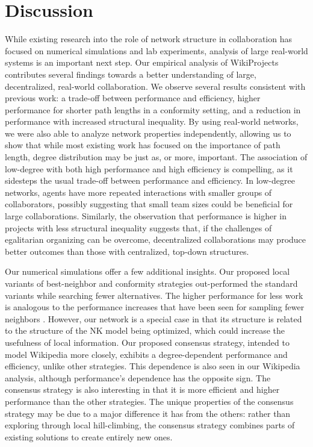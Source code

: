 \section{Discussion}
\label{sec:discuss}

While existing research into the role of network structure in collaboration
has focused on numerical simulations and lab experiments,
analysis of large real-world systems is an important next step.
Our empirical analysis of WikiProjects contributes several findings towards a better
understanding of large, decentralized, real-world collaboration.
We observe several results consistent with previous work:
a trade-off between performance and efficiency,
higher performance for shorter path lengths in a conformity setting,
and a reduction in performance with increased structural inequality.
By using real-world networks, we were also able to analyze network properties independently,
allowing us to show that while most existing work has focused on the importance of path length,
degree distribution may be just as, or more, important.
The association of low-degree with both high performance and high efficiency is compelling,
as it sidesteps the usual trade-off between performance and efficiency.
In low-degree networks, agents have more repeated interactions with smaller groups of collaborators,
possibly suggesting that small team sizes could be beneficial for large collaborations.
Similarly, the observation that performance is higher in projects with less structural inequality suggests that,
if the challenges of egalitarian organizing can be overcome,
decentralized collaborations may produce better outcomes than those with centralized, top-down structures.

Our numerical simulations offer a few additional insights.
Our proposed local variants of best-neighbor and conformity strategies out-performed
the standard variants while searching fewer alternatives.
The higher performance for less work is analogous to the performance increases that
have been seen for sampling fewer neighbors \cite{barkoczi_social_2016}.
However, our network is a special case in that its structure is related to the structure of
the NK model being optimized, which could increase the usefulness of local information.
Our proposed consensus strategy, intended to model Wikipedia more closely,
exhibits a degree-dependent performance and efficiency, unlike other strategies.
This dependence is also seen in our Wikipedia analysis, although performance's dependence has the opposite sign.
The consensus strategy is also interesting in that it is more efficient and higher performance than the other strategies.
The unique properties of the consensus strategy may be due to a major difference it has from the others:
rather than exploring through local hill-climbing,
the consensus strategy combines parts of existing solutions to create entirely new ones.

